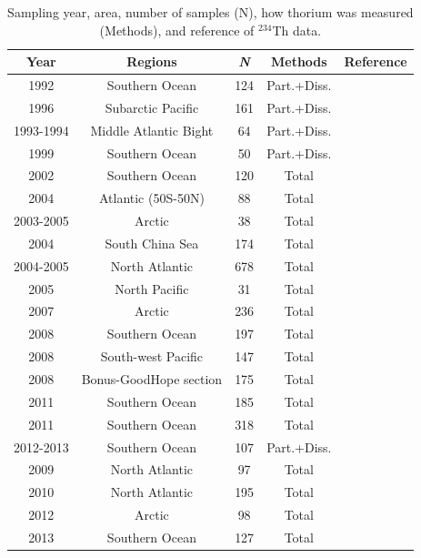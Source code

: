 \clearpage
\begin{table}
\centering
\caption{Sampling year, area, number of samples (N), how thorium was measured (Methods), and reference of $^{234}$Th data.}
    \begin{tabular}{c c c c c}
    \hline\hline
    Year     & Regions               & \textit{N} & Methods & Reference\\
    \hline
    1992     & Southern Ocean        &124&Part.+Diss.& \cite{van1997}\\
    1996     & Subarctic Pacific     &161&Part.+Diss.& \cite{charette1999}\\
    1993-1994&Middle Atlantic Bight  &64 &Part.+Diss.& \cite{santschi1999}\\
    1999     &Southern Ocean         &50 &Part.+Diss.& \cite{coppola2005}\\
    2002     &Southern Ocean         &120&Total & \cite{buesseler2005}\\
    2004     &Atlantic (50S-50N)     &88 &Total & \cite{thomalla2006}\\
    2003-2005&Arctic                 &38 &Total & \cite{lalande2008}\\
    2004     &South China Sea        &174&Total & \cite{cai2008}\\
    2004-2005&North Atlantic         &678&Total & \cite{Buesseler2008}\\
    2005     &North Pacific          &31 &Total & \cite{Kawakami2010}\\
    2007     &Arctic                 &236&Total & \cite{Cai2010}\\
    2008     &Southern Ocean         &197&Total & \cite{vanderLoeff2011}\\
    2008     &South-west Pacific     &147&Total & \cite{Zhou2012}\\
    2008     &Bonus-GoodHope section &175&Total & \cite{Planchon2013}\\
    2011     &Southern Ocean         &185&Total & \cite{planchon2015}\\
    2011     &Southern Ocean         &318&Total & \cite{rosengard2015}\\
    2012-2013&Southern Ocean         &107&Part.+Diss.& \cite{roca2017}\\
    2009     &North Atlantic         &97 &Total & \cite{LeMoigne2013}\\
    2010     &North Atlantic         &195&Total & \cite{LeMoigne2014}\\
    2012     &Arctic                 &98 &Total & \cite{LeMoigne2015}\\
    2013     &Southern Ocean         &127&Total & \cite{le2016}\\
    \hline\hline
    \end{tabular}
\end{table}


